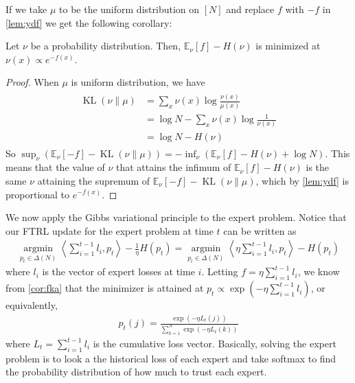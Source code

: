 \documentclass{article}
\begin{document}
If we take $\mu$ to be the uniform distribution on $[N]$ and replace $f$ with $-f$ in \cref{lem:ydf} we get the following corollary:
\begin{cora}\label{cor:fka}
 Let $\nu$ be a probability distribution. Then, $\mathbb{E}_{\nu}[f]-H(\nu)$ is minimized at $\nu(x) \propto e^{-f(x)}$.
\end{cora}
\begin{proof}\color{ForestGreen}
  When $\mu$ is uniform distribution, we have
\begin{align*}
\begin{aligned}
\operatorname{KL}(\nu \| \mu) &=\sum_{x} \nu(x) \log \frac{\nu(x)}{\mu(x)} \\
&=\log N-\sum_{x} \nu(x) \log \frac{1}{\nu(x)} \\
&=\log N-H(\nu)
\end{aligned}
\end{align*}
So $\sup _{\nu}\left(\mathbb{E}_{\nu}[-f]-\operatorname{KL}(\nu \| \mu)\right)=-\inf _{\nu}\left(\mathbb{E}_{\nu}[f]-H(\nu)+\log N\right) .$ This means that the value of $\nu$ that attains the infimum of $\mathbb{E}_{\nu}[f]-H(\nu)$ is the same $\nu$ attaining the supremum of $\mathbb{E}_{\nu}[-f]-\operatorname{KL}(\nu \| \mu)$, which by \cref{lem:ydf} is proportional to $e^{-f(x)}$.
\end{proof} 


We now apply the Gibbs variational principle to the expert problem. Notice that our FTRL update for the expert problem at time $t$ can be written as
\begin{align*}
\underset{p_{t} \in \Delta(N)}{\operatorname{argmin}}\left\langle\sum_{i=1}^{t-1} l_{i}, p_{t}\right\rangle-\frac{1}{\eta} H\left(p_{t}\right)=\underset{p_{t} \in \Delta(N)}{\operatorname{argmin}}\left\langle\eta \sum_{i=1}^{t-1} l_{i}, p_{t}\right\rangle-H\left(p_{t}\right)
\end{align*}
where $l_{i}$ is the vector of expert losses at time $i$. Letting $f=\eta \sum_{i=1}^{t-1} l_{i}$, we know from \cref{cor:fka} that the minimizer is attained at $p_{t} \propto \exp \left(-\eta \sum_{i=1}^{t-1} l_{i}\right)$, or equivalently,
\begin{align*}
p_{t}(j)=\frac{\exp \left(-\eta L_{t}(j)\right)}{\sum_{k=1}^{N} \exp \left(-\eta L_{t}(k)\right)}
\end{align*}
where $L_{t}=\sum_{i=1}^{t-1} l_{i}$ is the cumulative loss vector. Basically, solving the expert problem is to look a the historical loss of each expert and take softmax to find the probability distribution of how much to trust each expert.
\end{document}
